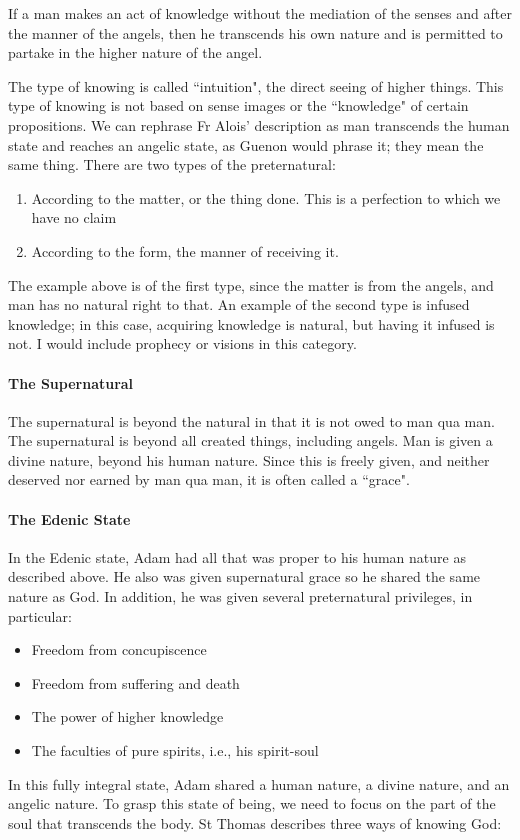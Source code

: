 If a man makes an act of knowledge without the mediation of the senses and after the manner of the angels, then he transcends his own nature and is permitted to partake in the higher nature of the angel.

The type of knowing is called ``intuition", the direct seeing of higher things. This type of knowing is not based on sense images or the ``knowledge" of certain propositions. We can rephrase Fr Alois' description as man transcends the human state and reaches an angelic state, as Guenon would phrase it; they mean the same thing. There are two types of the preternatural:

\begin{enumerate}
\item According to the matter, or the thing done. This is a perfection to which we have no claim 
\item According to the form, the manner of receiving it. 
\end{enumerate}
The example above is of the first type, since the matter is from the angels, and man has no natural right to that. An example of the second type is infused knowledge; in this case, acquiring knowledge is natural, but having it infused is not. I would include prophecy or visions in this category.

\paragraph{The Supernatural}
The supernatural is beyond the natural in that it is not owed to man qua man. The supernatural is beyond all created things, including angels. Man is given a divine nature, beyond his human nature. Since this is freely given, and neither deserved nor earned by man qua man, it is often called a ``grace".

\paragraph{The Edenic State}
In the Edenic state, Adam had all that was proper to his human nature as described above. He also was given supernatural grace so he shared the same nature as God. In addition, he was given several preternatural privileges, in particular:

\begin{itemize}
\item Freedom from concupiscence 
\item Freedom from suffering and death 
\item The power of higher knowledge 
\item The faculties of pure spirits, i.e., his spirit-soul 
\end{itemize}
In this fully integral state, Adam shared a human nature, a divine nature, and an angelic nature. To grasp this state of being, we need to focus on the part of the soul that transcends the body. St Thomas describes three ways of knowing God:

